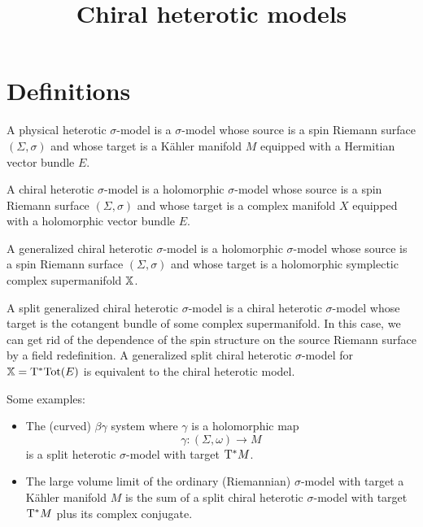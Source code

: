 \documentclass[11pt]{amsart}
\begin{document}
\title{Chiral heterotic models}


\begin{abstract}
\end{abstract}

\maketitle


\setcounter{tocdepth}{1}

\section{Definitions}

A physical heterotic $\sigma$-model is a $\sigma$-model whose source is a spin Riemann surface $(\Sigma, \sigma)$ and whose target is a K\"ahler manifold $M$ equipped with a Hermitian vector bundle $E$. 

A chiral heterotic $\sigma$-model is a holomorphic $\sigma$-model whose source is a spin Riemann surface $(\Sigma, \sigma)$ and whose target is a complex manifold $X$ equipped with a holomorphic vector bundle $E$. 

A generalized chiral heterotic $\sigma$-model is a holomorphic $\sigma$-model whose source is a spin Riemann surface $(\Sigma, \sigma)$ and whose target is a holomorphic symplectic complex supermanifold $\mathbb X$.
 
A split generalized chiral heterotic $\sigma$-model is a chiral heterotic $\sigma$-model whose target is the cotangent bundle of some complex supermanifold. 
In this case, we can get rid of the dependence of the spin structure on the source Riemann surface by a field redefinition. 
A generalized split chiral heterotic $\sigma$-model for $\mathbb X = {\rm T}^*{\rm Tot}(E)$ is equivalent to the chiral heterotic model. 

Some examples:
\begin{itemize}
\item 
The (curved) $\beta\gamma$ system where $\gamma$ is a holomorphic map
\[
\gamma \colon (\Sigma, \omega) \to M 
\]
is a split heterotic $\sigma$-model with target ${\rm T}^*M$. 
\item 
The large volume limit of the ordinary (Riemannian) $\sigma$-model with target a K\"ahler manifold $M$ is the sum of a split chiral heterotic $\sigma$-model with target ${\rm T}^* M$ plus its complex conjugate. 
\end{itemize}
\end{document}

